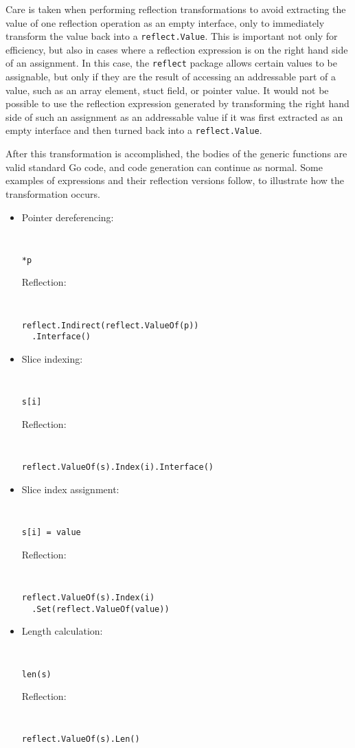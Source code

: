 \documentclass[letterpaper,twocolumn,11pt]{article}
\begin{document}
Care is taken when performing reflection transformations to avoid extracting the value of one reflection operation as an empty interface, only to immediately transform the value back into a \texttt{reflect.Value}. This is important not only for efficiency, but also in cases where a reflection expression is on the right hand side of an assignment. In this case, the \texttt{reflect} package allows certain values to be assignable, but only if they are the result of accessing an addressable part of a value, such as an array element, stuct field, or pointer value. It would not be possible to use the reflection expression generated by transforming the right hand side of such an assignment as an addressable value if it was first extracted as an empty interface and then turned back into a \texttt{reflect.Value}.

After this transformation is accomplished, the bodies of the generic functions are valid standard Go code, and code generation can continue as normal. Some examples of expressions and their reflection versions follow, to illustrate how the transformation occurs.

\begin{itemize}
\item
Pointer dereferencing:
{ \tt \small
\begin{verbatim}
*p
\end{verbatim}
}
Reflection:
{ \tt \small
\begin{verbatim}
reflect.Indirect(reflect.ValueOf(p))
  .Interface()
\end{verbatim}
}

\item
Slice indexing:
{ \tt \small
\begin{verbatim}
s[i]
\end{verbatim}
}
Reflection:
{ \tt \small
\begin{verbatim}
reflect.ValueOf(s).Index(i).Interface()
\end{verbatim}
}

\item
Slice index assignment:
{ \tt \small
\begin{verbatim}
s[i] = value
\end{verbatim}
}
Reflection:
{ \tt \small
\begin{verbatim}
reflect.ValueOf(s).Index(i)
  .Set(reflect.ValueOf(value))
\end{verbatim}
}

\item
Length calculation:
{ \tt \small
\begin{verbatim}
len(s)
\end{verbatim}
}
Reflection:
{ \tt \small
\begin{verbatim}
reflect.ValueOf(s).Len()
\end{verbatim}
}

\end{itemize}
\end{document}
